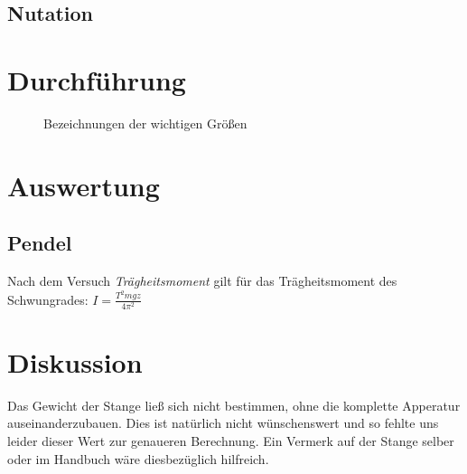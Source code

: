 \documentclass[12pt,a4paper,titlepage,headinclude,bibtotoc]{scrartcl}
\begin{document}
\subsection{Nutation}

 

 
\section{Durchführung}
\label{sec:durchfuehrung}

 \begin{figure}[htb]
 \centering \def\svgwidth{100pt}
 
\caption{Bezeichnungen der wichtigen Größen\label{img:wichtigegr}}
 \end{figure}


\section{Auswertung}
\label{sec:auswertung}
\subsection{Pendel}
Nach dem Versuch \emph{Trägheitsmoment} gilt für das Trägheitsmoment des Schwungrades: $I=\frac{T^2mgz}{4\pi^2}$

\section{Diskussion}
\label{sec:diskussion}
Das Gewicht der Stange ließ sich nicht bestimmen, ohne die komplette Apperatur auseinanderzubauen.
Dies ist natürlich nicht wünschenswert und so fehlte uns leider dieser Wert zur genaueren Berechnung.
Ein Vermerk auf der Stange selber oder im Handbuch wäre diesbezüglich hilfreich.
\end{document}
